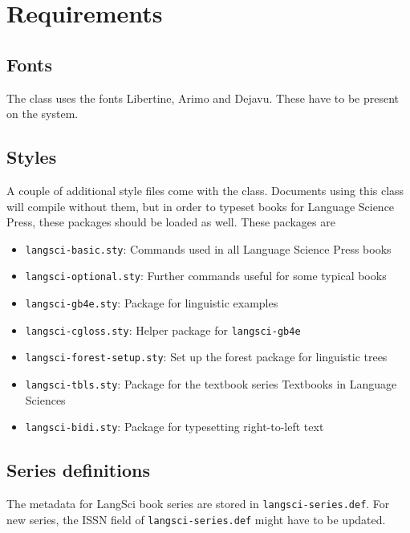 \documentclass[%
output=guidelines,
guidelines]{langscibook}
\begin{document}
\chapter{Requirements}
\section{Fonts}
The class uses the fonts Libertine, Arimo and Dejavu. These have to be present on the system. 

\section{Styles}
A couple of additional style files come with the class. Documents using this class will compile without them, but in order to typeset books for Language Science Press, these packages should be loaded as well. These packages are

\begin{itemize}
 \item \texttt{langsci-basic.sty}: Commands used in all Language Science Press books
 \item \texttt{langsci-optional.sty}: Further commands useful for some typical books
 \item \texttt{langsci-gb4e.sty}: Package for linguistic examples
 \item \texttt{langsci-cgloss.sty}: Helper package for \texttt{langsci-gb4e}
 \item \texttt{langsci-forest-setup.sty}: Set up the forest package for linguistic trees
 \item \texttt{langsci-tbls.sty}: Package for the textbook series Textbooks in Language Sciences
 \item \texttt{langsci-bidi.sty}: Package for typesetting right-to-left text

\end{itemize}

\section{Series definitions}
The metadata for LangSci book series are stored in   \texttt{langsci-series.def}.  For new series, the ISSN field of \texttt{langsci-series.def} might have to be updated. 
\end{document}
